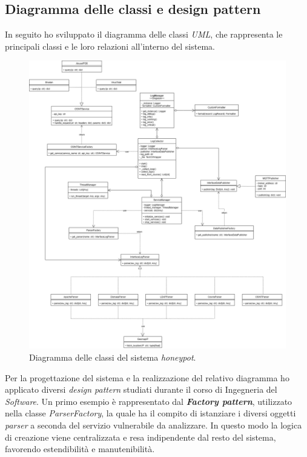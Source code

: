 \subsection*{Diagramma delle classi e design pattern}
In seguito ho sviluppato il diagramma delle classi \textit{UML}, che rappresenta le principali classi e le loro relazioni all'interno del sistema.
\begin{figure}[H]
    \begin{center}
    \includegraphics[width=\textwidth]{img/Diagramma-classi.png}
    \caption{Diagramma delle classi del sistema \textit{honeypot}.}
    \label{fig:class-diagram}
    \end{center}
\end{figure}
Per la progettazione del sistema e la realizzazione del relativo diagramma ho applicato diversi \textit{design pattern} studiati durante il corso di Ingegneria del \textit{Software}. 
Un primo esempio è rappresentato dal \textbf{\textit{Factory pattern}}, utilizzato nella classe \textit{ParserFactory}, la quale ha il compito di istanziare i diversi oggetti \textit{parser} a seconda del servizio vulnerabile da analizzare. 
In questo modo la logica di creazione viene centralizzata e resa indipendente dal resto del sistema, favorendo estendibilità e manutenibilità. 
